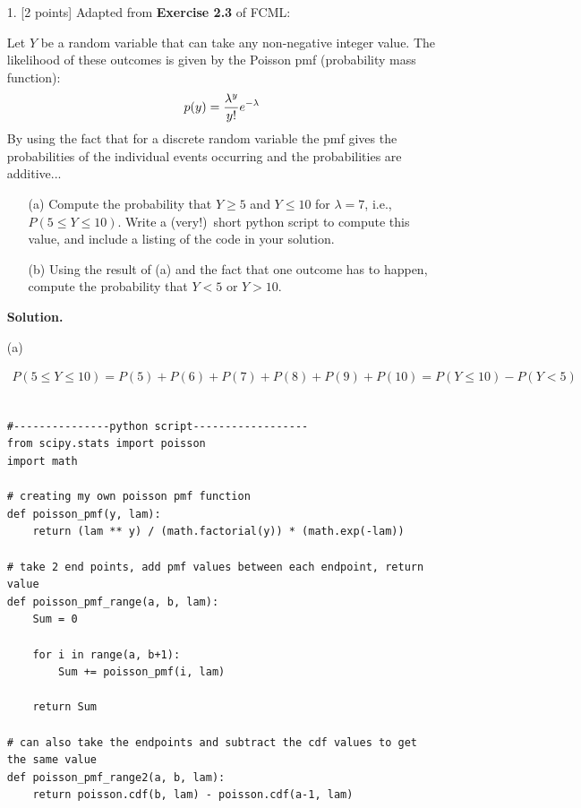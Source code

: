\documentclass[10pt]{article}
\begin{document}
\newpage
\begin{itemize}

\item[1.] [2 points]
Adapted from {\bf Exercise 2.3} of FCML:

Let $Y$ be a random variable that can take any non-negative integer value.  The likelihood of these outcomes is given by the Poisson pmf (probability mass function):
\begin{eqnarray}
p(y) = {\lambda^y\over y!} e^{-\lambda}
\end{eqnarray}
By using the fact that for a discrete random variable the pmf gives the probabilities of the individual events occurring and the probabilities are additive...
\begin{enumerate}
\item[(a)] Compute the probability that $Y \geq 5$ and $Y \leq 10$ for $\lambda = 7$, i.e., $P(5 \leq Y \leq 10)$.  Write a (very!)~short python script to compute this value, and include a listing of the code in your solution.
\item[(b)] Using the result of (a) and the fact that one outcome has to happen, compute the probability that $Y < 5$ or $Y > 10$.
\end{enumerate}

{\bf Solution.} %

(a)

\begin{align*}
    P(5 \leq Y \leq 10) = 
    P(5) +
    P(6) +
    P(7) +
    P(8) +
    P(9) +
    P(10) =
    P(Y \leq 10) - P(Y < 5)
\end{align*}

\begin{verbatim}

#---------------python script------------------
from scipy.stats import poisson
import math

# creating my own poisson pmf function
def poisson_pmf(y, lam):
    return (lam ** y) / (math.factorial(y)) * (math.exp(-lam))

# take 2 end points, add pmf values between each endpoint, return value
def poisson_pmf_range(a, b, lam):
    Sum = 0
    
    for i in range(a, b+1):
        Sum += poisson_pmf(i, lam)
        
    return Sum

# can also take the endpoints and subtract the cdf values to get the same value        
def poisson_pmf_range2(a, b, lam):
    return poisson.cdf(b, lam) - poisson.cdf(a-1, lam)
    

\end{verbatim}
\end{itemize}
\end{document}
